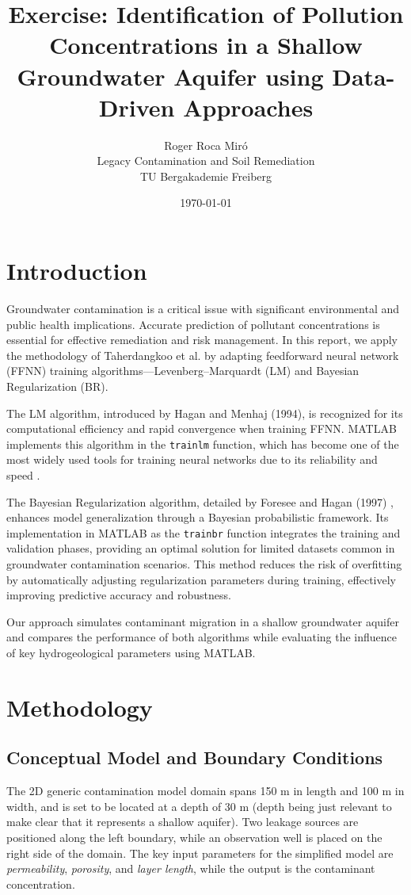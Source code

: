 \documentclass[10pt]{article}
\title{Exercise: Identification of Pollution Concentrations in a Shallow Groundwater Aquifer using Data-Driven Approaches}
\author{Roger Roca Miró \\ Legacy Contamination and Soil Remediation \\ TU Bergakademie Freiberg}
\date{\today}
\begin{document}
	
	\maketitle
	
	\section{Introduction}
	Groundwater contamination is a critical issue with significant environmental and public health implications. Accurate prediction of pollutant concentrations is essential for effective remediation and risk management. In this report, we apply the methodology of Taherdangkoo et al. \cite{taherdangkoo2020} by adapting feedforward neural network (FFNN) training algorithms—Levenberg–Marquardt (LM) and Bayesian Regularization (BR).

	The LM algorithm, introduced by Hagan and Menhaj (1994), is recognized for its computational efficiency and rapid convergence when training FFNN. MATLAB implements this algorithm in the \texttt{trainlm} function, which has become one of the most widely used tools for training neural networks due to its reliability and speed \cite{hagan1994,matlab}.

	The Bayesian Regularization algorithm, detailed by Foresee and Hagan (1997) \cite{foresee1997,matlab}, enhances model generalization through a Bayesian probabilistic framework. Its implementation in MATLAB as the \texttt{trainbr} function integrates the training and validation phases, providing an optimal solution for limited datasets common in groundwater contamination scenarios. This method reduces the risk of overfitting by automatically adjusting regularization parameters during training, effectively improving predictive accuracy and robustness.

	Our approach simulates contaminant migration in a shallow groundwater aquifer and compares the performance of both algorithms while evaluating the influence of key hydrogeological parameters using MATLAB.
	
	\section{Methodology}
	\subsection{Conceptual Model and Boundary Conditions}
	The 2D generic contamination model domain spans 150 m in length and 100 m in width, and is set to be located at a depth of 30 m (depth being just relevant to make clear that it represents a shallow aquifer). Two leakage sources are positioned along the left boundary, while an observation well is placed on the right side of the domain. The key input parameters for the simplified model are \textit{permeability}, \textit{porosity}, and \textit{layer length}, while the output is the contaminant concentration.
	
\end{document}
